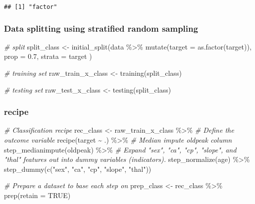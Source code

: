 \documentclass[
]{book}
\newenvironment{Shaded}{\begin{snugshade}}{\end{snugshade}}
\newcommand{\AttributeTok}[1]{\textcolor[rgb]{0.77,0.63,0.00}{#1}}
\newcommand{\CommentTok}[1]{\textcolor[rgb]{0.56,0.35,0.01}{\textit{#1}}}
\newcommand{\ConstantTok}[1]{\textcolor[rgb]{0.00,0.00,0.00}{#1}}
\newcommand{\FloatTok}[1]{\textcolor[rgb]{0.00,0.00,0.81}{#1}}
\newcommand{\FunctionTok}[1]{\textcolor[rgb]{0.00,0.00,0.00}{#1}}
\newcommand{\NormalTok}[1]{#1}
\newcommand{\OtherTok}[1]{\textcolor[rgb]{0.56,0.35,0.01}{#1}}
\newcommand{\SpecialCharTok}[1]{\textcolor[rgb]{0.00,0.00,0.00}{#1}}
\newcommand{\StringTok}[1]{\textcolor[rgb]{0.31,0.60,0.02}{#1}}
\begin{document}
\begin{verbatim}
## [1] "factor"
\end{verbatim}

\hypertarget{data-splitting-using-stratified-random-sampling}{%
\subsubsection{Data splitting using stratified random sampling}\label{data-splitting-using-stratified-random-sampling}}

\begin{Shaded}
\begin{Highlighting}[]
\CommentTok{\# split}
\NormalTok{split\_class }\OtherTok{\textless{}{-}} \FunctionTok{initial\_split}\NormalTok{(data }\SpecialCharTok{\%\textgreater{}\%}
  \FunctionTok{mutate}\NormalTok{(}\AttributeTok{target =} \FunctionTok{as.factor}\NormalTok{(target)),}
\AttributeTok{prop =} \FloatTok{0.7}\NormalTok{,}
\AttributeTok{strata =}\NormalTok{ target}
\NormalTok{)}

\CommentTok{\# training set}
\NormalTok{raw\_train\_x\_class }\OtherTok{\textless{}{-}} \FunctionTok{training}\NormalTok{(split\_class)}

\CommentTok{\# testing set}
\NormalTok{raw\_test\_x\_class }\OtherTok{\textless{}{-}} \FunctionTok{testing}\NormalTok{(split\_class)}
\end{Highlighting}
\end{Shaded}

\hypertarget{recipe-1}{%
\subsubsection{recipe}\label{recipe-1}}

\begin{Shaded}
\begin{Highlighting}[]
\CommentTok{\# Classification recipe}
\NormalTok{rec\_class }\OtherTok{\textless{}{-}}\NormalTok{ raw\_train\_x\_class }\SpecialCharTok{\%\textgreater{}\%}
  \CommentTok{\# Define the outcome variable}
  \FunctionTok{recipe}\NormalTok{(target }\SpecialCharTok{\textasciitilde{}}\NormalTok{ .) }\SpecialCharTok{\%\textgreater{}\%}
  \CommentTok{\# Median impute oldpeak column}
  \FunctionTok{step\_medianimpute}\NormalTok{(oldpeak) }\SpecialCharTok{\%\textgreater{}\%}
  \CommentTok{\# Expand "sex", "ca", "cp", "slope", and "thal" features out into dummy variables (indicators).}
  \FunctionTok{step\_normalize}\NormalTok{(age) }\SpecialCharTok{\%\textgreater{}\%}
  \FunctionTok{step\_dummy}\NormalTok{(}\FunctionTok{c}\NormalTok{(}\StringTok{"sex"}\NormalTok{, }\StringTok{"ca"}\NormalTok{, }\StringTok{"cp"}\NormalTok{, }\StringTok{"slope"}\NormalTok{, }\StringTok{"thal"}\NormalTok{))}

\CommentTok{\# Prepare a dataset to base each step on}
\NormalTok{prep\_class }\OtherTok{\textless{}{-}}\NormalTok{ rec\_class }\SpecialCharTok{\%\textgreater{}\%} \FunctionTok{prep}\NormalTok{(}\AttributeTok{retain =} \ConstantTok{TRUE}\NormalTok{)}
\end{Highlighting}
\end{Shaded}
\end{document}

